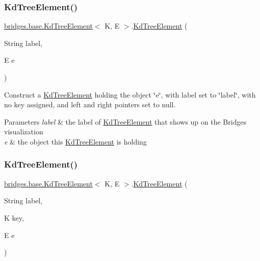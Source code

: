 \subsubsection{\texorpdfstring{Kd\+Tree\+Element()}{KdTreeElement()}\hspace{0.1cm}{\footnotesize\ttfamily [8/10]}}
{\footnotesize\ttfamily \mbox{\hyperlink{classbridges_1_1base_1_1_kd_tree_element}{bridges.\+base.\+Kd\+Tree\+Element}}$<$ K, E $>$.\mbox{\hyperlink{classbridges_1_1base_1_1_kd_tree_element}{Kd\+Tree\+Element}} (\begin{DoxyParamCaption}\item[{String}]{label,  }\item[{E}]{e }\end{DoxyParamCaption})}

Construct a \mbox{\hyperlink{classbridges_1_1base_1_1_kd_tree_element}{Kd\+Tree\+Element}} holding the object \char`\"{}e\char`\"{}, with label set to \char`\"{}label\char`\"{}, with no key assigned, and left and right pointers set to null. 
\begin{DoxyParams}{Parameters}
{\em label} & the label of \mbox{\hyperlink{classbridges_1_1base_1_1_kd_tree_element}{Kd\+Tree\+Element}} that shows up on the Bridges visualization \\
\hline
{\em e} & the object this \mbox{\hyperlink{classbridges_1_1base_1_1_kd_tree_element}{Kd\+Tree\+Element}} is holding \\
\hline
\end{DoxyParams}
\mbox{\label{classbridges_1_1base_1_1_kd_tree_element_ad2c3a73929648e6afce54536790d94c9}} 
\subsubsection{\texorpdfstring{Kd\+Tree\+Element()}{KdTreeElement()}\hspace{0.1cm}{\footnotesize\ttfamily [9/10]}}
{\footnotesize\ttfamily \mbox{\hyperlink{classbridges_1_1base_1_1_kd_tree_element}{bridges.\+base.\+Kd\+Tree\+Element}}$<$ K, E $>$.\mbox{\hyperlink{classbridges_1_1base_1_1_kd_tree_element}{Kd\+Tree\+Element}} (\begin{DoxyParamCaption}\item[{String}]{label,  }\item[{K}]{key,  }\item[{E}]{e }\end{DoxyParamCaption})}


